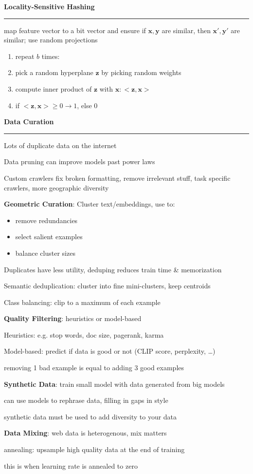\documentclass[8pt,letter,landscape]{article}
\newcommand{\sectiontitle}[1]{\textbf{\large #1}\vspace{0.2em}\hrule\vspace{0.5em}}
\begin{document}
\begin{multicols*}{3}
\sectiontitle{Locality-Sensitive Hashing}
map feature vector to a bit vector and ensure if $\mathbf{x}, \mathbf{y}$ are similar, then $\mathbf{x}', \mathbf{y}'$ are similar; use random projections

\begin{enumerate}[leftmargin=*,nosep]
    \item repeat $b$ times:
    \item pick a random hyperplane $\mathbf{z}$ by picking random weights
    \item compute inner product of $\mathbf{z}$ with $\mathbf{x}: <\mathbf{z}, \mathbf{x}>$
    \item if $<\mathbf{z}, \mathbf{x}> \geq 0 \rightarrow 1$, else 0
\end{enumerate}

\sectiontitle{Data Curation}
Lots of duplicate data on the internet

Data pruning can improve models past power laws

Custom crawlers fix broken formatting, remove irrelevant stuff, task specific crawlers, more geographic diversity

\textbf{Geometric Curation}: Cluster text/embeddings, use to:
\begin{itemize}[leftmargin=*,nosep]
    \item remove redundancies
    \item select salient examples
    \item balance cluster sizes
\end{itemize}

Duplicates have less utility, deduping reduces train time \& memorization

Semantic deduplication: cluster into fine mini-clusters, keep centroids

Class balancing: clip to a maximum of each example

\textbf{Quality Filtering}: heuristics or model-based

Heuristics: e.g. stop words, doc size, pagerank, karma

Model-based: predict if data is good or not (CLIP score, perplexity, \dots)

removing 1 bad example is equal to adding 3 good examples

\textbf{Synthetic Data}: train small model with data generated from big models

can use models to rephrase data, filling in gaps in style

synthetic data must be used to add diversity to your data

\textbf{Data Mixing}: web data is heterogenous, mix matters

annealing: upsample high quality data at the end of training

this is when learning rate is annealed to zero

\end{multicols*}
\end{document}

